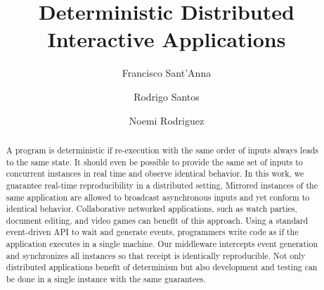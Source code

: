 \documentclass[sigplan,screen]{acmart}
\begin{document}
\title{Deterministic Distributed Interactive Applications}

\author{Francisco Sant'Anna}

\author{Rodrigo Santos}

\author{Noemi Rodriguez}


\begin{abstract}
A program is deterministic if re-execution with the same order of inputs always
leads to the same state.
It should even be possible to provide the same set of inputs to concurrent
instances in real time and observe identical behavior.
%
In this work, we guarantee real-time reproducibility in a distributed setting.
Mirrored instances of the same application are allowed to broadcast
asynchronous inputs and yet conform to identical behavior.
Collaborative networked applications, such as watch parties, document editing,
and video games can benefit of this approach.
%
Using a standard event-driven API to wait and generate events, programmers
write code as if the application executes in a single machine.
Our middleware intercepts event generation and synchronizes all instances so
that receipt is identically reproducible.
Not only distributed applications benefit of determinism but also development
and testing can be done in a single instance with the same guarantees.
\end{abstract}

\begin{comment}
\begin{CCSXML}
<ccs2012>
 <concept>
  <concept_id>10003033.10003083.10003095</concept_id>
  <concept_desc>Networks~Network reliability</concept_desc>
  <concept_significance>100</concept_significance>
 </concept>
</ccs2012>
\end{CCSXML}
\ccsdesc[100]{Networks~Network reliability}
\end{comment}


\maketitle
\end{document}
